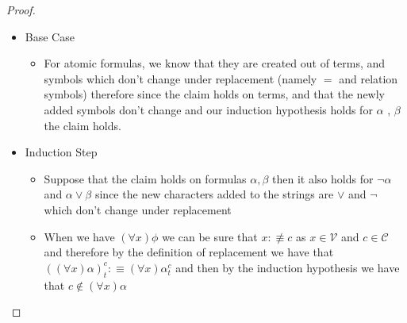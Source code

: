 \begin{proof}
\begin{itemize}
        \item Base Case
        \begin{itemize}
            \item For atomic formulas, we know that they are created out of terms, and symbols which don't change under replacement (namely $ = $ and relation symbols)   therefore since the claim holds on terms, and that the newly added symbols don't change and our induction hypothesis holds for $ \alpha  $ , $ \beta  $ the claim holds.
        \end{itemize}
        \item Induction Step
        \begin{itemize}
            \item Suppose that the claim holds on formulas $ \alpha, \beta  $ then it also holds for $ \neg \alpha  $ and $ \alpha \lor \beta  $ since the new characters added to the strings are $ \lor  $ and $ \neg  $ which don't change under replacement
            \item When we have $ \left( \forall x \right) \phi  $ we can be sure that $ x  :\not\equiv c  $ as $ x \in  \mathcal{ V }   $ and $ c \in  \mathcal{ C }   $ and therefore by the definition of replacement we have that $ \left( \left( \forall x \right) \alpha \right) _{ t }^{ c }  :\equiv \left( \forall x \right) \alpha _{ t }^{ c }  $  and then by the induction hypothesis we have that $ c \not\in \left( \forall x \right) \alpha  $ 
        \end{itemize}
    \end{itemize}
\end{proof}
